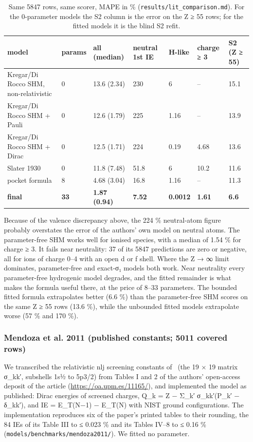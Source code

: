 \documentclass[aps,pra,preprint,superscriptaddress,amsmath,amssymb]{revtex4-2}
\begin{document}
\begin{table}[htbp]
\caption{Same 5847 rows, same scorer, MAPE in \% (\texttt{results/lit\_comparison.md}). For the 0-parameter models the S2 column is the error on the Z ≥ 55 rows; for the fitted models it is the blind S2 refit.}
\footnotesize
\begin{ruledtabular}
\begin{tabular}{lllllll}
model & params & all (median) & neutral 1st IE & H-like & charge ≥ 3 & S2 (Z ≥ 55) \\
\hline
Kregar/Di Rocco SHM, non-relativistic & 0 & 13.6 (2.34) & 230 & 6 & – & 15.1 \\
Kregar/Di Rocco SHM + Pauli & 0 & 12.6 (1.79) & 225 & 1.16 & – & 13.9 \\
Kregar/Di Rocco SHM + Dirac & 0 & 12.5 (1.71) & 224 & 0.19 & 4.68 & 13.6 \\
Slater 1930 & 0 & 11.8 (7.48) & 51.8 & 6 & 10.2 & 11.6 \\
pocket formula & 8 & 4.68 (3.04) & 16.8 & 1.16 & – & 11.3 \\
\textbf{final} & \textbf{33} & \textbf{1.87 (0.94)} & \textbf{7.52} & \textbf{0.0012} & \textbf{1.61} & \textbf{6.6} \\
\end{tabular}
\end{ruledtabular}
\end{table}


Because of the valence discrepancy above, the 224 \% neutral-atom figure probably overstates the error of the authors' own model on neutral atoms. The parameter-free SHM works well for ionised species, with a median of 1.54 \% for charge ≥ 3. It fails near neutrality: 37 of its 5847 predictions are zero or negative, all for ions of charge 0–4 with an open d or f shell. Where the Z → ∞ limit dominates, parameter-free and exact-σ₁ models both work. Near neutrality every parameter-free hydrogenic model degrades, and the fitted remainder is what makes the formula useful there, at the price of 8–33 parameters. The bounded fitted formula extrapolates better (6.6 \%) than the parameter-free SHM scores on the same Z ≥ 55 rows (13.6 \%), while the unbounded fitted models extrapolate worse (57 \% and 170 \%).


\subsubsection{Mendoza et al. 2011 (published constants; 5011 covered rows)}

We transcribed the relativistic nlj screening constants of~\cite{r16} (the 19 × 19 matrix σ\_kk′, subshells 1s½ to 5p3/2) from Tables I and 2 of the authors' open-access deposit of the article (\url{https://oa.upm.es/11165/}), and implemented the model as published: Dirac energies of screened charges, Q\_k = Z − Σ\_k′ σ\_kk′(P\_k′ − δ\_kk′), and IE = E\_T(N−1) − E\_T(N) with NIST ground configurations. The implementation reproduces six of the paper's printed tables to their rounding, the 84 IEs of its Table III to ≤ 0.023 \% and its Tables IV–8 to ≤ 0.16 \% (\texttt{models/benchmarks/mendoza2011/}). We fitted no parameter.
\end{document}
